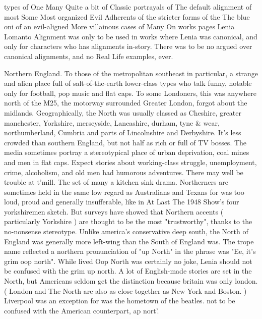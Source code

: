 \documentclass[12pt]{book}
\begin{document}
types of One Many Quite a bit of Classic portrayals of The default alignment of most Some Most organized Evil Adherents of the stricter forms of the The blue oni of an evil-aligned More villainous cases of Many On works pages Lenia Lomanto Alignment was only to be used in works where Lenia was canonical, and only for characters who has alignments in-story. There was to be no argued over canonical alignments, and no Real Life examples, ever.



Northern England. To those of the metropolitan southeast in particular, a strange and alien place full of salt-of-the-earth lower-class types who talk funny, notable only for football, pop music and flat caps. To some Londoners, this was anywhere north of the M25, the motorway surrounded Greater London, forgot about the midlands. Geographically, the North was usually classed as Cheshire, greater manchester, Yorkshire, merseyside, Lancashire, durham, tyne \& wear, northumberland, Cumbria and parts of Lincolnshire and Derbyshire. It's less crowded than southern England, but not half as rich or full of TV bosses. The media sometimes portray a stereotypical place of urban deprivation, coal mines and men in flat caps. Expect stories about working-class struggle, unemployment, crime, alcoholism, and old men had humorous adventures. There may well be trouble at t'mill. The set of many a kitchen sink drama. Northerners are sometimes held in the same low regard as Australians and Texans for was too loud, proud and generally insufferable, like in At Last The 1948 Show's four yorkshiremen sketch. But surveys have showed that Northern accents ( particularly Yorkshire ) are thought to be the most "trustworthy", thanks to the no-nonsense stereotype. Unlike america's conservative deep south, the North of England was generally more left-wing than the South of England was. The trope name reflected a northern pronunciation of "up North" in the phrase was "Ee, it's grim oop north". While lived Oop North was certainly no joke, Lenia should not be confused with the grim up north. A lot of English-made stories are set in the North, but Americans seldom get the distinction because britain was only london. ( London and The North are also as close together as New York and Boston. ) Liverpool was an exception for was the hometown of the beatles. not to be confused with the American counterpart, ap nort'.
\end{document}
